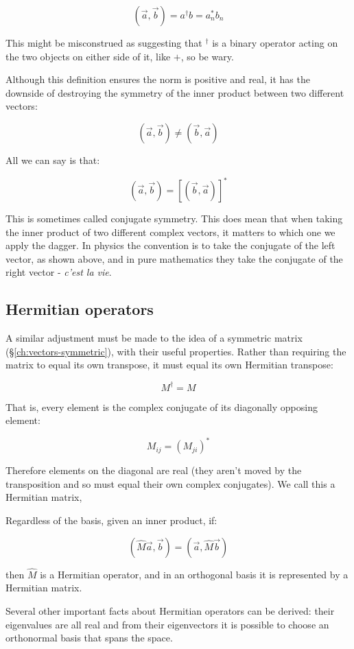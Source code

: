 $$
(\vec{a}, \vec{b}) = a^\dagger b = a_n^* b_n
$$

This might be misconstrued as suggesting that $^\dagger$ is a binary operator acting on the two objects on either side of it, like $+$, so be wary.

Although this definition ensures the norm is positive and real, it has the downside of destroying the symmetry of the inner product between two different vectors:

$$
(\vec{a}, \vec{b})
\ne
(\vec{b}, \vec{a})
$$

All we can say is that:

$$
(\vec{a}, \vec{b})
=
\left[ (\vec{b}, \vec{a}) \right]^*
$$

This is sometimes called conjugate symmetry. This does mean that when taking the inner product of two different complex vectors, it matters to which one we apply the dagger. In physics the convention is to take the conjugate of the left vector, as shown above, and in pure mathematics they take the conjugate of the right vector - \textit{c'est la vie}.

\subsection{Hermitian operators}

A similar adjustment must be made to the idea of a symmetric matrix (§\ref{ch:vectors-symmetric}), with their useful properties. Rather than requiring the matrix to equal its own transpose, it must equal its own Hermitian transpose:

$$M^\dagger = M$$

That is, every element is the complex conjugate of its diagonally opposing element:

$$M_{ij} = (M_{ji})^*$$

Therefore elements on the diagonal are real (they aren't moved by the transposition and so must equal their own complex conjugates). We call this a Hermitian matrix,

Regardless of the basis, given an inner product, if:

$$(\hat{M} \vec{a}, \vec{b}) = (\vec{a}, \hat{M} \vec{b})$$

then $\hat{M}$ is a Hermitian operator, and in an orthogonal basis it is represented by a Hermitian matrix.

Several other important facts about Hermitian operators can be derived: their eigenvalues are all real and from their eigenvectors it is possible to choose an orthonormal basis that spans the space.

